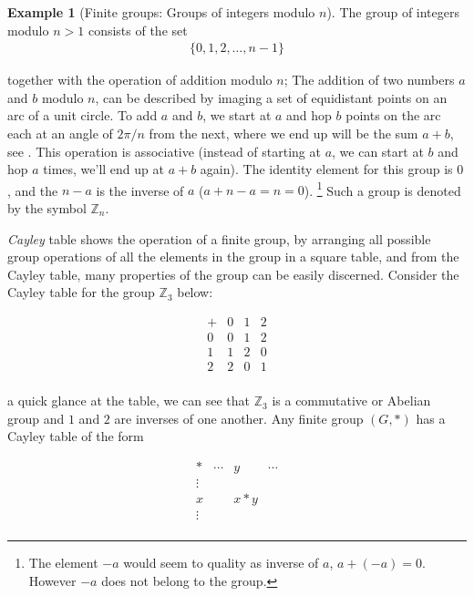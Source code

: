 \documentclass[nohyper,nobib]{tufte-handout}
\theoremstyle{definition}
\newtheorem{exmp}[thm]{Example}
\theoremstyle{remark}
\begin{document}
\begin{exmp}[Finite groups: Groups of integers modulo $n$]
    The group of integers modulo $n>1$ consists of the set
    \begin{align}
        \{0, 1, 2, \ldots, n - 1\}
    \end{align}

    \noindent
together with the operation of addition modulo $n$; The addition of two numbers $a$ and $b$ modulo $n$, can be described by imaging a set of equidistant points on an arc of a unit circle. To add $a$ and $b$, we start at $a$ and hop $b$ points on the arc each at an angle of $2\pi/n$ from the next, where we end up will be the sum $a + b$, see . This operation is associative (instead of starting at $a$, we can start at $b$ and hop $a$ times, we'll end up at $a + b$ again). The identity element for this group is $0$, and the $n - a$ is the inverse of $a$ ($a + n - a = n = 0$). \footnote{The element $-a$  would seem to quality as inverse of $a$, $a + (-a) = 0$. However $-a$ does not belong to the group.} Such a group is denoted by the symbol $\mathbb{Z}_{n}$.

\emph{Cayley} table shows the operation of a finite group, by arranging all possible group operations of all the elements in the group in a square table, and from the Cayley table, many properties of the group can be easily discerned. Consider the Cayley table for the group $\mathbb{Z}_3$ below:

\[
    \begin{array}{l|*{3}{l}}
       +   & 0   & 1   & 2 \\
    \hline
       0   &  0  &  1  & 2\\
       1   &  1  &  2  & 0 \\
       2   &  2  &  0  & 1 \\
    \end{array} 
\]

\noindent
a quick glance at the table, we can see that $\mathbb{Z}_3$ is a commutative or Abelian group and $1$ and $2$ are inverses of one another. Any finite group $(G, *)$ has a Cayley table of the form

\[
    \begin{array}{l|*{4}{c}}
        *   & \cdots   &  y  & \cdots \\
    \hline
       \vdots   &     &   &     \\
       x        &     & x*y   &     \\
       \vdots   &     &   & \\
    \end{array} 
\]


\end{exmp}
\end{document}

